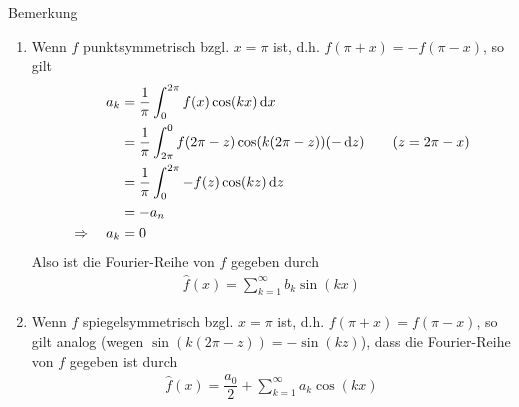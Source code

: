 \begin{colbox}{Bemerkung}
  \begin{enumerate}
    \item 
    Wenn $f$ punktsymmetrisch bzgl. $x=\pi$ ist, d.h. $f(\pi+x) = -f(\pi-x)$, so gilt 
    \begin{align*}
      a_k &= \frac{1}{\pi} \int_0^{2\pi} f(x) \cos(kx)  \mathop{}\!\mathrm{d} x \\
      &= \frac{1}{\pi} \int_{2\pi}^{0} f(2\pi - z) \cos(k(2\pi - z))  (-\mathop{}\!\mathrm{d} z) \qquad (z = 2\pi - x) \\
      &= \frac{1}{\pi} \int_0^{2\pi} -f(z) \cos(kz)  \mathop{}\!\mathrm{d} z \\
      &= -a_n \\
      \Rightarrow \quad a_k &= 0
    \end{align*}
    Also ist die Fourier-Reihe von $f$ gegeben durch 
    \begin{align*}
      \hat{f}(x) = \sum_{k=1}^{\infty} b_k\sin(kx)
    \end{align*}
    \item Wenn $f$ spiegelsymmetrisch bzgl. $x=\pi$ ist, d.h. $f(\pi+x)=f(\pi-x)$, so gilt analog 
    (wegen $\sin(k(2\pi-z))=-\sin(kz)$), dass die Fourier-Reihe von $f$ gegeben ist durch 
    \begin{align*}
      \hat{f}(x) = \dfrac{a_0}{2} + \sum_{k=1}^{\infty} a_k\cos(kx)
    \end{align*}
  \end{enumerate}
\end{colbox}

